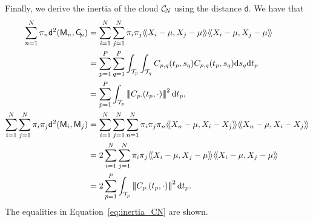 Finally, we derive the inertia of the cloud $\mathcal{C}_{\!N}$ using the distance $\mathsf{d}$. We have that
\begin{align}
\sum_{n = 1}^N \pi_n \mathsf{d}^2(\pfea{M}_n, \Gfea) &= \sum_{i = 1}^N \sum_{j = 1}^N \pi_i \pi_j \inH{X_i - \mu}{X_j - \mu}\inH{X_i - \mu}{X_j - \mu} \\
&= \sum_{p = 1}^P \sum_{q = 1}^P \int_{\TT{p}} \int_{\TT{q}} C_{p,q}(t_p, s_q)C_{p,q}(t_p, s_q) \dd s_q \dd t_p \\
&= \sum_{p = 1}^P \int_{\TT{p}} \normH{C_{p \cdot}(t_p, \cdot)}^2 \dd t_p,\\
\sum_{i = 1}^N \sum_{j = 1}^N \pi_i \pi_j \mathsf{d}^2(\pfea{M}_i, \pfea{M}_j) &= \sum_{i = 1}^N \sum_{j = 1}^N \sum_{n = 1}^N \pi_i \pi_j \pi_n \inH{X_n - \mu}{X_i - X_j}\inH{X_n - \mu}{X_i - X_j} \\
&= 2\sum_{i = 1}^N \sum_{j = 1}^N \pi_i \pi_j \inH{X_i - \mu}{X_j - \mu}\inH{X_i - \mu}{X_j - \mu} \\
&= 2\sum_{p = 1}^P \int_{\TT{p}} \normH{C_{p \cdot}(t_p, \cdot)}^2 \dd t_p.
\end{align}
The equalities in Equation~\eqref{eq:inertia_CN} are shown.

